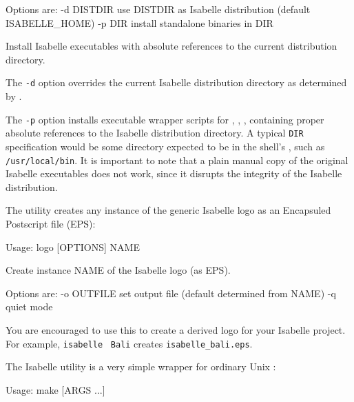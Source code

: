 \begin{isabellebody}
\begin{isamarkuptext}
\begin{ttbox}
  Options are:
    -d DISTDIR   use DISTDIR as Isabelle distribution
                 (default ISABELLE_HOME)
    -p DIR       install standalone binaries in DIR

  Install Isabelle executables with absolute references to the current
  distribution directory.
\end{ttbox}

  The \verb|-d| option overrides the current Isabelle
  distribution directory as determined by \hyperlink{setting.ISABELLE-HOME}{\mbox{}}.

  The \verb|-p| option installs executable wrapper scripts for
  \hyperlink{executable.isabelle-process}{\mbox{}}, \hyperlink{executable.isabelle}{\mbox{}},
  \hyperlink{executable.Isabelle}{\mbox{}}, containing proper absolute references to the
  Isabelle distribution directory.  A typical \verb|DIR|
  specification would be some directory expected to be in the shell's
  \hyperlink{setting.PATH}{\mbox{}}, such as \verb|/usr/local/bin|.  It is
  important to note that a plain manual copy of the original Isabelle
  executables does not work, since it disrupts the integrity of the
  Isabelle distribution.%
\end{isamarkuptext}%
\isamarkuptrue%
%
\isamarkuptrue%
%
\begin{isamarkuptext}%
The \hypertarget{tool.logo}{\hyperlink{tool.logo}{\mbox{}}} utility creates any instance of the generic
  Isabelle logo as an Encapsuled Postscript file (EPS):
\begin{ttbox}
Usage: logo [OPTIONS] NAME

  Create instance NAME of the Isabelle logo (as EPS).

  Options are:
    -o OUTFILE   set output file (default determined from NAME)
    -q           quiet mode
\end{ttbox}
  You are encouraged to use this to create a derived logo for your
  Isabelle project.  For example, \verb|isabelle| \hyperlink{tool.logo}{\mbox{}}~\verb|Bali| creates \verb|isabelle_bali.eps|.%
\end{isamarkuptext}%
\isamarkuptrue%
%
\isamarkuptrue%
%
\begin{isamarkuptext}%
The Isabelle \hypertarget{tool.make}{\hyperlink{tool.make}{\mbox{}}} utility is a very simple wrapper for
  ordinary Unix \hyperlink{executable.make}{\mbox{}}:
\begin{ttbox}
Usage: make [ARGS ...]


\end{ttbox}
\end{isamarkuptext}
\end{isabellebody}
